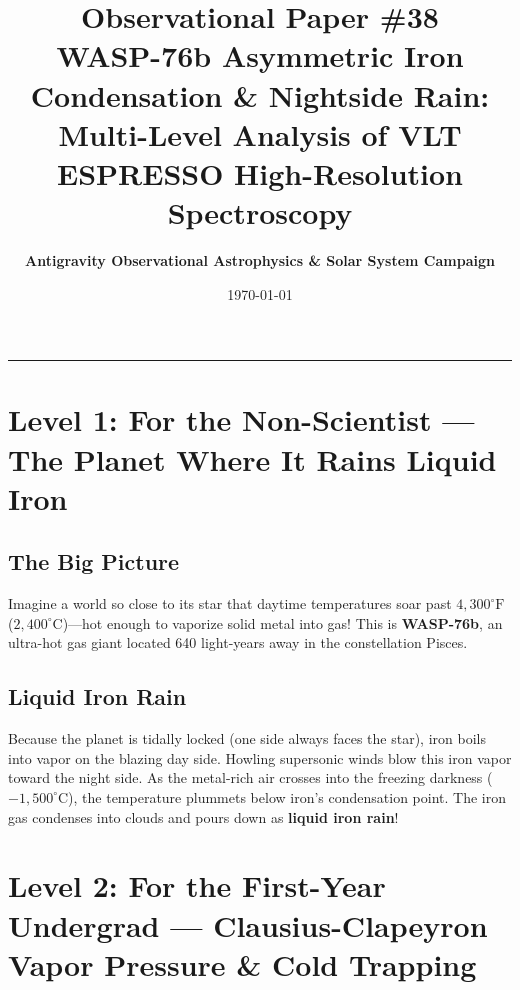\documentclass[11pt,a4paper]{article}
\title{\Huge \textbf{Observational Paper \#38}\\ \Large WASP-76b Asymmetric Iron Condensation \& Nightside Rain: Multi-Level Analysis of VLT ESPRESSO High-Resolution Spectroscopy}
\author{\textbf{Antigravity Observational Astrophysics \& Solar System Campaign}}
\date{\today}
\begin{document}
\maketitle

\vspace{-1em}
\begin{center}
\rule{\textwidth}{1.5pt}
\end{center}

\section*{Level 1: For the Non-Scientist — The Planet Where It Rains Liquid Iron}

\subsection*{The Big Picture}
Imagine a world so close to its star that daytime temperatures soar past $4,300^\circ\text{F}$ ($2,400^\circ\text{C}$)—hot enough to vaporize solid metal into gas! This is \textbf{WASP-76b}, an ultra-hot gas giant located 640 light-years away in the constellation Pisces.

\subsection*{Liquid Iron Rain}
Because the planet is tidally locked (one side always faces the star), iron boils into vapor on the blazing day side. Howling supersonic winds blow this iron vapor toward the night side. As the metal-rich air crosses into the freezing darkness ($-1,500^\circ\text{C}$), the temperature plummets below iron's condensation point. The iron gas condenses into clouds and pours down as \textbf{liquid iron rain}!

\newpage

\section*{Level 2: For the First-Year Undergrad — Clausius-Clapeyron Vapor Pressure \& Cold Trapping}
\end{document}
